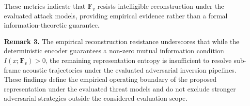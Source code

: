 \documentclass[a4paper,fleqn]{cas-sc}
\begin{document}
These metrics indicate that $\mathbf{F}_v$ resists intelligible reconstruction under the evaluated attack models, providing empirical evidence rather than a formal information-theoretic guarantee.

\medskip
\noindent\textbf{Remark 3.}
The empirical reconstruction resistance underscores that while the deterministic encoder guarantees a non-zero mutual information condition $I(x;\mathbf{F}_v) > 0$, the remaining representation entropy is insufficient to resolve sub-frame acoustic trajectories under the evaluated adversarial inversion pipelines. These findings define the empirical operating boundary of the proposed representation under the evaluated threat models and do not exclude stronger adversarial strategies outside the considered evaluation scope.




\end{document}
